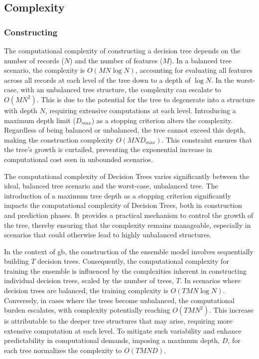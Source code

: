 \subsection{Complexity}

\subsubsection{Constructing}
The computational complexity of constructing a decision tree depends on the number of records ($N$) and the number of features ($M$). In a balanced tree scenario, the complexity is $O(MN\log N)$, accounting for evaluating all features across all records at each level of the tree down to a depth of $\log N$.
In the worst-case, with an unbalanced tree structure, the complexity can escalate to $O(MN^2)$. This is due to the potential for the tree to degenerate into a structure with depth $N$, requiring extensive computations at each level.
Introducing a maximum depth limit ($D_{max}$) as a stopping criterion alters the complexity. Regardless of being balanced or unbalanced, the tree cannot exceed this depth, making the construction complexity $O(MND_{max})$. This constraint ensures that the tree's growth is curtailed, preventing the exponential increase in computational cost seen in unbounded scenarios.

The computational complexity of Decision Trees varies significantly between the ideal, balanced tree scenario and the worst-case, unbalanced tree. The introduction of a maximum tree depth as a stopping criterion significantly impacts the computational complexity of Decision Trees, both in construction and prediction phases. It provides a practical mechanism to control the growth of the tree, thereby ensuring that the complexity remains manageable, especially in scenarios that could otherwise lead to highly unbalanced structures.

In the context of \acrlong{gb}, the construction of the ensemble model involves sequentially building $T$ decision trees. Consequently, the computational complexity for training the ensemble is influenced by the complexities inherent in constructing individual decision trees, scaled by the number of trees, $T$. In scenarios where decision trees are balanced, the training complexity is $O(TMN\log N)$. Conversely, in cases where the trees become unbalanced, the computational burden escalates, with complexity potentially reaching $O(TMN^2)$. This increase is attributable to the deeper tree structures that may arise, requiring more extensive computation at each level. To mitigate such variability and enhance predictability in computational demands, imposing a maximum depth, $D$, for each tree normalizes the complexity to $O(TMND)$.

